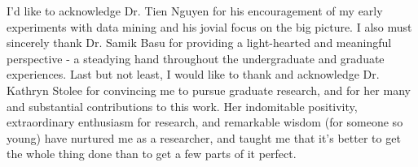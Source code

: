 \cleardoublepage {}
{}

I'd like to acknowledge Dr. Tien Nguyen for his encouragement of my early experiments with data mining and his jovial focus on the big picture.  I also must sincerely thank Dr. Samik Basu for providing a light-hearted and meaningful perspective - a steadying hand throughout the undergraduate and graduate experiences. Last but not least, I would like to thank and acknowledge Dr. Kathryn Stolee for convincing me to pursue graduate research, and for her many and substantial contributions to this work.  Her indomitable positivity, extraordinary enthusiasm for research, and remarkable wisdom (for someone so young) have nurtured me as a researcher, and taught me that it's better to get the whole thing done than to get a few parts of it perfect.
